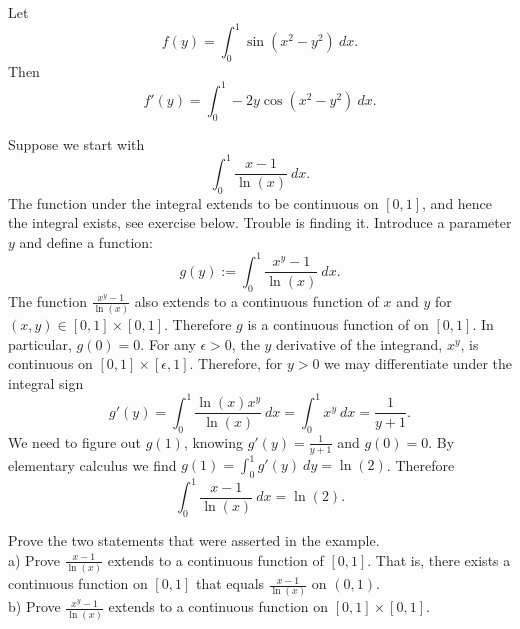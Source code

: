 \begin{example}
Let
\begin{equation*}
f(y) = \int_0^1 \sin(x^2-y^2) ~dx .
\end{equation*}
Then
\begin{equation*}
f'(y) = \int_0^1 -2y\cos(x^2-y^2) ~dx .
\end{equation*}
\end{example}

\begin{example}
Suppose we start with
\begin{equation*}
\int_0^{1} \frac{x-1}{\ln(x)} ~dx .
\end{equation*}
The function under the integral 
extends to be continuous on $[0,1]$, and hence
the integral exists, see exercise below.  Trouble is finding it.  Introduce a parameter $y$
and define a function:
\begin{equation*}
g(y) := \int_0^{1} \frac{x^y-1}{\ln(x)} ~dx .
\end{equation*}
The function
$\frac{x^y-1}{\ln(x)}$
also extends to a continuous function of $x$ and $y$
for $(x,y) \in [0,1] \times [0,1]$.
Therefore
$g$ is a continuous function of on $[0,1]$.  In particular, $g(0) = 0$.
For any $\epsilon > 0$, the $y$ derivative of the integrand, $x^y$,
is continuous on $[0,1] \times [\epsilon,1]$.  Therefore,
for $y >0$ we may differentiate under the integral sign
\begin{equation*}
g'(y) =
\int_0^{1} \frac{\ln(x) x^y}{\ln(x)} ~dx 
=
\int_0^{1} x^y ~dx =
\frac{1}{y+1} .
\end{equation*}
We need to figure out $g(1)$, knowing $g'(y) = \frac{1}{y+1}$ and $g(0) =
0$.  By elementary calculus we find $g(1) = \int_0^1 g'(y)~dy = \ln(2)$.  Therefore
\begin{equation*}
\int_0^{1} \frac{x-1}{\ln(x)} ~dx  = \ln(2).
\end{equation*}
\end{example}

\begin{exercise}
Prove the two statements that were asserted in the example.\\
a) Prove $\frac{x-1}{\ln(x)}$ extends to a continuous function of
$[0,1]$.  That is, there exists a continuous function on $[0,1]$
that equals $\frac{x-1}{\ln(x)}$ on $(0,1)$.\\
b) Prove $\frac{x^y-1}{\ln(x)}$ extends to a continuous function
on $[0,1] \times [0,1]$.
\end{exercise}

